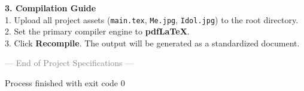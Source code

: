 \documentclass{article}
\begin{document}
\vspace{0.2in}

\noindent
\large\textbf{3. Compilation Guide} \\
\normalsize
1. Upload all project assets (\texttt{main.tex}, \texttt{Me.jpg}, \texttt{Idol.jpg}) to the root directory. \\
2. Set the primary compiler engine to \textbf{pdfLaTeX}. \\
3. Click \textbf{Recompile}. The output will be generated as a standardized document.

\vspace{0.4in}
\begin{center}
    \small\textcolor{gray}{--- End of Project Specifications ---}
\end{center}

\vfill
\noindent
\textcolor{CommentGreen}{Process finished with exit code 0}
\end{document}
